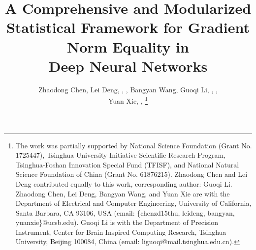\documentclass[10pt,journal,compsoc]{IEEEtran}
\begin{document}
\title{ A Comprehensive and Modularized Statistical Framework for Gradient Norm Equality in \\Deep Neural Networks}

\author{Zhaodong Chen, Lei Deng, , , Bangyan Wang, Guoqi Li, , ,   \\Yuan Xie, , 
\thanks{The work was partially supported by National Science Foundation (Grant No. 1725447), Tsinghua University Initiative Scientiﬁc Research Program, Tsinghua-Foshan Innovation Special Fund (TFISF), and National Natural Science Foundation of China (Grant No. 61876215). Zhaodong Chen and Lei Deng contributed equally to this work, corresponding author: Guoqi Li. Zhaodong Chen, Lei Deng, Bangyan Wang, and Yuan Xie are with the Department of Electrical and Computer Engineering, University of California, Santa Barbara, CA 93106, USA (email: \{chenzd15thu, leideng, bangyan, yuanxie\}@ucsb.edu). Guoqi Li is with the Department of Precision Instrument, Center for Brain Inspired Computing Research, Tsinghua University, Beijing 100084, China (email: liguoqi@mail.tsinghua.edu.cn).
}}
\end{document}
